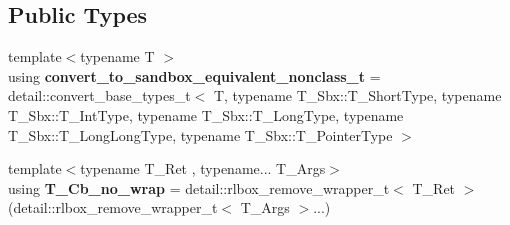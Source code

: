 \subsection*{Public Types}
\begin{DoxyCompactItemize}
\item 
\mbox{\label{classrlbox_1_1rlbox__sandbox_a2236c8f780e2fbb505b616a05d632298}} 
{\footnotesize template$<$typename T $>$ }\\using {\bfseries convert\+\_\+to\+\_\+sandbox\+\_\+equivalent\+\_\+nonclass\+\_\+t} = detail\+::convert\+\_\+base\+\_\+types\+\_\+t$<$ T, typename T\+\_\+\+Sbx\+::\+T\+\_\+\+Short\+Type, typename T\+\_\+\+Sbx\+::\+T\+\_\+\+Int\+Type, typename T\+\_\+\+Sbx\+::\+T\+\_\+\+Long\+Type, typename T\+\_\+\+Sbx\+::\+T\+\_\+\+Long\+Long\+Type, typename T\+\_\+\+Sbx\+::\+T\+\_\+\+Pointer\+Type $>$
\item 
\mbox{\label{classrlbox_1_1rlbox__sandbox_a09c972acd976ab264478c3abd32f8383}} 
{\footnotesize template$<$typename T\+\_\+\+Ret , typename... T\+\_\+\+Args$>$ }\\using {\bfseries T\+\_\+\+Cb\+\_\+no\+\_\+wrap} = detail\+::rlbox\+\_\+remove\+\_\+wrapper\+\_\+t$<$ T\+\_\+\+Ret $>$(detail\+::rlbox\+\_\+remove\+\_\+wrapper\+\_\+t$<$ T\+\_\+\+Args $>$...)
\end{DoxyCompactItemize}
